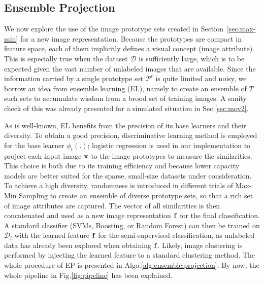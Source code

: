 \subsection{Ensemble Projection}
We now explore the use of the image prototype sets created in
Section~\ref{sec:max-min} for a new image representation.  Because the
prototypes are compact in feature space, each of them implicitly
defines a visual concept (image attribute). This is especially true
when the dataset $\mathcal{D}$ is sufficiently large, which is to be
expected given the vast number of unlabeled images that are
available.  Since the information carried by a single prototype set
$\mathcal{P}^t$ is quite limited and noisy, we borrow an idea from
ensemble learning (EL), namely to create an ensemble of $T$ such sets to
accumulate wisdom from a brood set of training images. A sanity check of this was
already presented for a simulated situation in Sec.\ref{sec:mov2}.

As is well-known, EL benefits from the precision of its base learners
and their diversity.  
To obtain a good precision, discriminative learning method is employed for the
base learner $\phi_t(.)$; logistic regression is used in our
implementation to project each input image ${\mathbf x}$ to the image
prototypes to measure the similarities. This choice is both due to its
training efficiency and because lower capacity models are better suited
for the sparse, small-size datasets under consideration.  To achieve a high
diversity, randomness is introduced in different trials of Max-Min
Sampling to create an ensemble of diverse prototype sets, so that a
rich set of image attributes are captured.
The vector of all similarities is then concatenated and used as a new
image representation ${\mathbf f}$ for the final classification. A
standard classifier (\eg SVMs, Boosting, or Random Forest) can then be
trained on $\mathcal{D}_l$ with the learned feature ${\mathbf f}$ for the
semi-supervised classification, as unlabeled data has already been
explored when obtaining ${\mathbf f}$. Likely, image clustering is
performed by injecting the learned feature to a standard clustering
method.  The whole procedure of EP is presented in
Algo.\ref{alg:ensemble:projection}.  By now, the whole pipeline in
Fig.\ref{fig:pipeline} has been explained.

